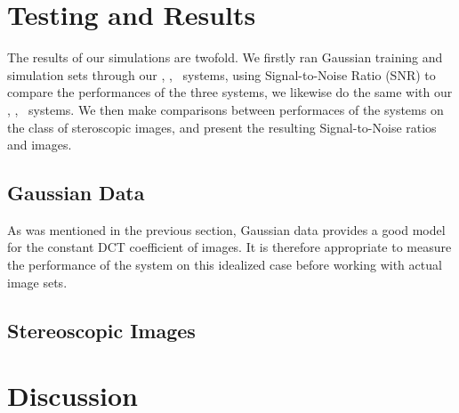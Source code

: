 \section{Testing and Results}
The results of our simulations are twofold. We firstly ran Gaussian training and simulation sets through our \sysII, \sysIJ, \sysJJ\ systems, using Signal-to-Noise Ratio (SNR) to compare the performances of the three systems, we likewise do the same with our \sysIIN, \sysIJN, \sysJJN\ systems. We then make comparisons between performaces of the systems on the class of steroscopic images, and present the resulting Signal-to-Noise ratios and images.
\subsection{Gaussian Data}
As was mentioned in the previous section, Gaussian data provides a good model for the constant DCT coefficient of images. It is therefore appropriate to measure the performance of the system on this idealized case before working with actual image sets.

\subsection{Stereoscopic Images}

\section{Discussion}
